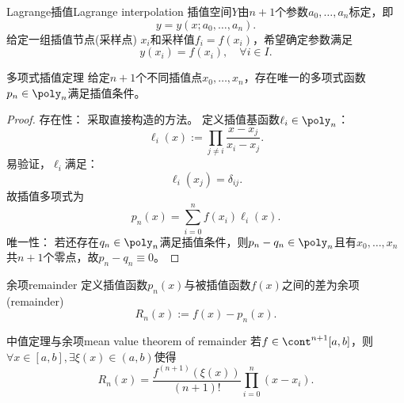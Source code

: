 \begin{definition}
    {Lagrange插值}{Lagrange interpolation}
    插值空间$Y$由$n+1$个参数$a_0,\ldots,a_n$标定，即
    \[
        y=y(x;a_0,\ldots,a_n).
    \]
    给定一组插值节点(采样点) $x_i$和采样值$f_i=f(x_i)$，希望确定参数满足
    \begin{equation}
        y(x_i)=f(x_i),\quad\forall i\in I.
    \end{equation}
\end{definition}

\begin{theorem}
    {多项式插值定理}{}
    给定$n+1$个不同插值点$x_0,\ldots,x_n$，存在唯一的多项式函数$p_n\in\poly_n$满足插值条件。
\end{theorem}
\begin{proof}
    存在性：
    采取直接构造的方法。
    定义插值基函数$\ell_i\in\poly_n$：
    \begin{equation}
        \label{eqn:Lagrange base}
        \ell_i(x):=\prod_{j\neq i}\frac{x-x_j}{x_i-x_j}.
    \end{equation}
    易验证，$\ell_i$满足：
    \begin{equation}
        \ell_i(x_j)=\delta_{ij}.
    \end{equation}
    故插值多项式为
    \begin{equation}
        \label{eqn:Lagrange polynomial}
        p_n(x)=\sum_{i=0}^nf(x_i)\ell_i(x).
    \end{equation}
    唯一性：
    若还存在$q_n\in\poly_n$满足插值条件，则$p_n-q_n\in\poly_n$且有$x_0,\ldots,x_n$共$n+1$个零点，故$p_n-q_n\equiv 0$。
\end{proof}

\begin{definition}
    {余项}{remainder}
    定义插值函数$p_n(x)$与被插值函数$f(x)$之间的差为余项(remainder)
    \begin{equation}
        R_n(x):=f(x)-p_n(x).
    \end{equation}
\end{definition}

\begin{theorem}
    {中值定理与余项}{mean value theorem of remainder}
    若$f\in\cont^{n+1}[a,b]$，则$\forall x\in[a,b],\exists\xi(x)\in(a,b)$使得
    \begin{equation}
        \label{eqn:Lagrange remainder}
        R_n(x)=\frac{f^{(n+1)}(\xi(x))}{(n+1)!}\prod_{i=0}^n(x-x_i).
    \end{equation}
\end{theorem}

